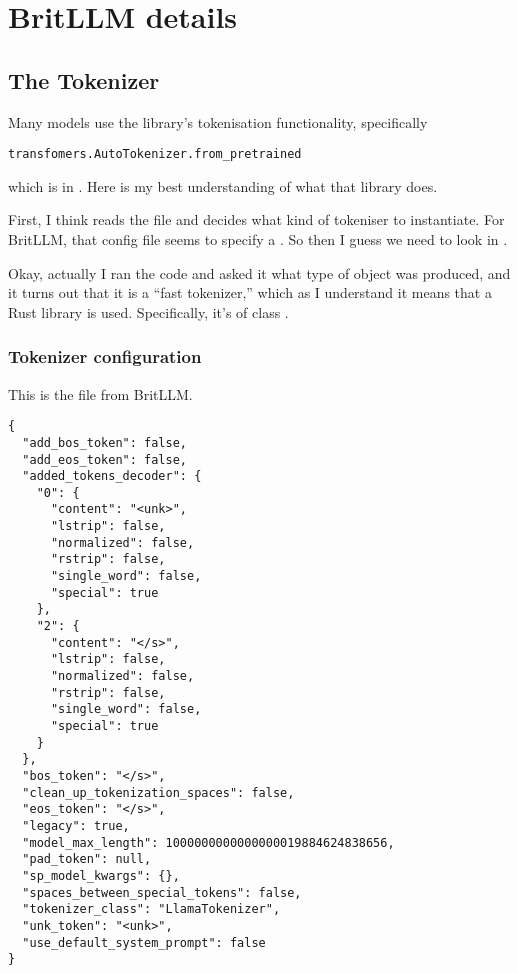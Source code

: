 \documentclass[11pt, a4paper]{article}
\begin{document}
\appendix

\section{BritLLM details}

\subsection{The Tokenizer}

Many models use the  library's tokenisation
functionality, specifically
\begin{verbatim}
transfomers.AutoTokenizer.from_pretrained
\end{verbatim}
which is in . Here is my best
understanding of what that library does.

First, I think  reads the file
 and decides what kind of tokeniser to
instantiate. For BritLLM, that config file seems to specify a
. So then I guess we need to look in
.

Okay, actually I ran the code and asked it what type of object was
produced, and it turns out that it is a ``fast tokenizer,'' which as I
understand it means that a Rust library is used. Specifically, it's of
class
. 

\subsubsection{Tokenizer configuration}

This is the file  from BritLLM\@.
{\small
\begin{verbatim}
{
  "add_bos_token": false,
  "add_eos_token": false,
  "added_tokens_decoder": {
    "0": {
      "content": "<unk>",
      "lstrip": false,
      "normalized": false,
      "rstrip": false,
      "single_word": false,
      "special": true
    },
    "2": {
      "content": "</s>",
      "lstrip": false,
      "normalized": false,
      "rstrip": false,
      "single_word": false,
      "special": true
    }
  },
  "bos_token": "</s>",
  "clean_up_tokenization_spaces": false,
  "eos_token": "</s>",
  "legacy": true,
  "model_max_length": 1000000000000000019884624838656,
  "pad_token": null,
  "sp_model_kwargs": {},
  "spaces_between_special_tokens": false,
  "tokenizer_class": "LlamaTokenizer",
  "unk_token": "<unk>",
  "use_default_system_prompt": false
}
\end{verbatim}}
\end{document}

